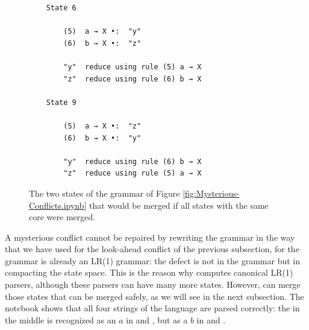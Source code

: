 \begin{figure}[!ht]
\centering
\begin{verbatim}
    State 6

        (5)  a → X •:  "y"
        (6)  b → X •:  "z"

        "y"  reduce using rule (5) a → X
        "z"  reduce using rule (6) b → X

    State 9

        (5)  a → X •:  "z"
        (6)  b → X •:  "y"

        "y"  reduce using rule (6) b → X
        "z"  reduce using rule (5) a → X
\end{verbatim}
\vspace*{-0.3cm}
\caption{The two states of the grammar of Figure \ref{fig:Mysterious-Conflicts.ipynb} that would be merged
  if all states with the same core were merged.}
\label{fig:Mysterious-Conflicts.states}
\end{figure}
\vspace*{0.3cm}

\remarkEng
A mysterious conflict cannot be repaired by rewriting the grammar in the way that we have used for the
look-ahead conflict of the previous subsection, for the grammar is already an LR(1) grammar: the defect is not
in the grammar but in compacting the state space.  This is the reason why  computes canonical
LR(1) parsers, although these parsers can have many more states.  However,  can merge those states that can be merged safely, as
we will see in the next subsection.  The notebook shows that all four strings of the language are parsed correctly: the
 in the middle is recognized as an $a$ in  and , but as a $b$ in
 and .
\eox

